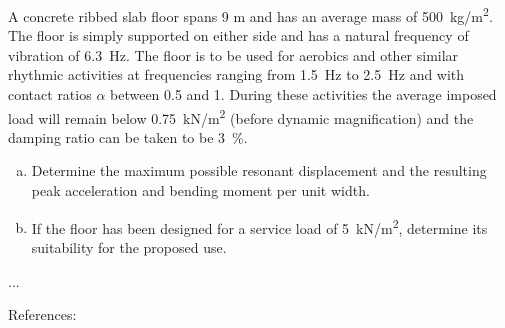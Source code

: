 
\begin{Exercise}[label={footfall_analysis}]
A concrete ribbed slab floor spans 9 m and has an average mass of \SI{500}{kg/m^2}. The floor is simply supported on either side and has a natural frequency of vibration of \SI{6.3}{Hz}. 
The floor is to be used for aerobics and other similar rhythmic activities at frequencies ranging from \SI{1.5}{Hz} to \SI{2.5}{Hz} and with contact ratios $\alpha$ between 0.5 and 1. During these activities the average imposed load will remain below \SI{0.75}{kN/m^2} (before dynamic magnification) and the damping ratio can be taken to be \SI{3}{\%}.

\begin{enumerate}[(a)]
    \item Determine the maximum possible resonant displacement and the resulting peak acceleration and bending moment per unit width.
    \item If the floor has been designed for a service load of \SI{5}{kN/m^2}, determine its suitability for the proposed use.
\end{enumerate}

\begin{center}
\hspace{1em}
\end{center}

\shortAnswer ...

References: \cite[page ??]{chopra}
\end{Exercise}



